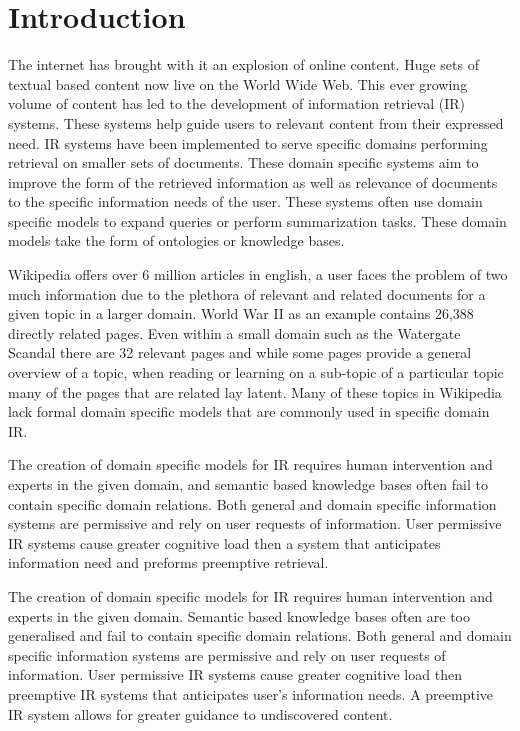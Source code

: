 \chapter{Introduction}

The internet has brought with it an explosion of online content. Huge sets of textual based content now live on the World Wide Web. This ever growing volume of content has led to the development of information retrieval (IR) systems. These systems help guide users to relevant content from their expressed need. IR systems have been implemented to serve specific domains performing retrieval on smaller sets of documents. These domain specific systems aim to improve the form of the retrieved information as well as relevance of documents to the specific information needs of the user. These systems often use domain specific models to expand queries or perform summarization tasks. These domain models take the form of ontologies or knowledge bases. 

Wikipedia offers over 6 million articles in english, a user faces the problem of two much information due to the plethora of relevant and related documents for a given topic in a larger domain. World War II as an example contains 26,388 directly related pages. Even within a small domain such as the Watergate Scandal there are 32 relevant pages and while some pages provide a general overview of a topic, when reading or learning on a sub-topic of a particular topic many of the pages that are related lay latent. Many of these topics in Wikipedia lack formal domain specific models that are commonly used in specific domain IR.

The creation of domain specific models for IR requires human intervention and experts in the given domain, and semantic based knowledge bases often fail to contain specific domain relations. Both general and domain specific information systems are permissive and rely on user requests of information. User permissive IR systems cause greater cognitive load then a system that anticipates information need and preforms preemptive retrieval.

The creation of domain specific models for IR requires human intervention and experts in the given domain. Semantic based knowledge bases often are too generalised and fail to contain specific domain relations. Both general and domain specific information systems are permissive and rely on user requests of information. User permissive IR systems cause greater cognitive load then preemptive IR systems that anticipates user’s information needs. A preemptive IR system allows for greater guidance to undiscovered content.

